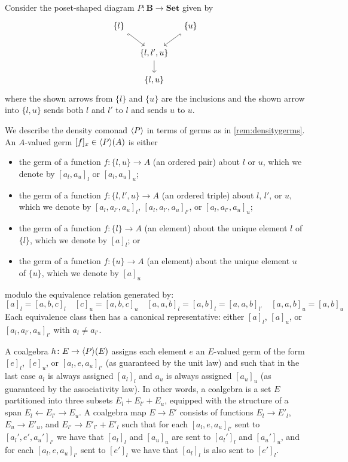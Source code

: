 \documentclass[11pt, oneside, article]{memoir}
\theoremstyle{plain}
\theoremstyle{definition}
\theoremstyle{remark}
\newenvironment{counterexample}
{\renewcommand\qedsymbol{$\lrcorner$}%
  \pushQED{\qed}\mycounterexample}
{\popQED\endmycounterexample}
\DeclarePairedDelimiter{\gen}{\langle}{\rangle}
\newcommand{\ot}{\leftarrow}
\newcommand{\namedcat}[1]{\mathbf{#1}}
\newcommand{\cat}[1]{\mathbf{#1}}
\newcommand{\Set}{\namedcat{Set}}
\newcommand{\ph}[1]{#1}
\newcommand{\setof}[1]{\{#1\}}
\newcommand{\eE}{E}
\newcommand{\xA}{A}
\newcommand{\hH}{h}
\newcommand{\bB}{\cat{B}}
\newcommand{\pP}{\ph{P}}
\newcommand{\cP}{\gen{\pP}}
\begin{document}
\begin{counterexample}[Non-taut subobject classifier]\label{ex:unlink}
  Consider the poset-shaped diagram
  $\pP \colon \bB \to \Set$ given by
  \[
    \begin{tikzcd}[row sep=15,column sep=10]
      {\setof{l}} && {\setof{u}} \\
      & {\setof{l, l', u}} \\
      & {\setof{l,u}}
      \arrow[hook', from=1-1, to=2-2]
      \arrow[hook, from=1-3, to=2-2]
      \arrow[from=2-2, to=3-2]
    \end{tikzcd}
  \]
  where the shown arrows from $\setof{l}$ and $\setof{u}$ are the inclusions
  and the shown arrow into $\setof{l,u}$ sends both $l$ and $l'$ to $l$ and
  sends $u$ to $u$.
  
  We describe the density comonad $\cP$ in terms of germs as in
  \cref{rem:densitygerms}. An $\xA$-valued germ $[f]_x \in \cP(\xA)$
  is either
  \begin{itemize}
  \item the germ of a function $f \colon \setof{l,u} \to \xA$ (an
    ordered pair) about $l$ or $u$, which we denote by $[a_l, a_u]_l$
    or $[a_l, a_u]_u$;
  \item the germ of a function $f \colon \setof{l,l',u} \to \xA$ (an
    ordered triple) about $l$, $l'$, or $u$, which we denote by
    $[a_l, a_{l'}, a_u]_l$, $[a_l, a_{l'}, a_u]_{l'}$, or
    $[a_l, a_{l'}, a_u]_u$;
  \item the germ of a function $f \colon \setof{l} \to \xA$ (an
    element) about the unique element $l$ of $\setof{l}$, which we
    denote by $[a]_l$; or
  \item the germ of a function $f \colon \setof{u} \to \xA$ (an
    element) about the unique element $u$ of $\setof{u}$, which we
    denote by $[a]_u$
  \end{itemize}
  modulo the equivalence relation generated by:
  \[
    [a]_l = [a, b, c]_l
    \quad
    [c]_u = [a, b, c]_u
    \quad
    [a, a, b]_l = [a, b]_l = [a, a, b]_{l'}
    \quad
    [a, a, b]_u = [a, b]_u
  \]
  Each equivalence class then has a canonical representative: either
  $[a]_l$, $[a]_u$, or $[a_l,a_{l'},a_u]_{l'}$ with $a_{l} \neq a_{l'}$.

  A coalgebra $\hH \colon \eE \to \cP(\eE)$ assigns each element $e$
  an $\eE$-valued germ of the form $[e]_l$, $[e]_u$, or
  $[a_l, e, a_u]_{l'}$ (as guaranteed by the unit law) and such that
  in the last case $a_l$ is always assigned $[a_l]_l$ and $a_u$ is
  always assigned $[a_u]_u$ (as guaranteed by the associativity
  law). In other words, a coalgebra is a set $\eE$ partitioned into
  three subsets $\eE_l + \eE_{l'} + \eE_u$, equipped with the
  structure of a span $\eE_l \ot \eE_{l'} \to \eE_u$. A coalgebra map
  $\eE \to \eE'$ consists of functions $\eE_l \to \eE'_l$,
  $\eE_u \to \eE'_u$, and $\eE_{l'} \to \eE'_{l'} + \eE'_l$ such that
  for each $[a_l, e, a_u]_{l'}$ sent to $[a_l', e', a_u']_{l'}$ we have that
  $[a_l]_l$ and $[a_u]_u$ are sent to $[a_l']_l$ and $[a_u']_u$, and
  for each $[a_l, e, a_u]_{l'}$ sent to $[e']_l$ we have that $[a_l]_l$ is
  also sent to $[e']_l$.
  

\end{counterexample}
\end{document}
